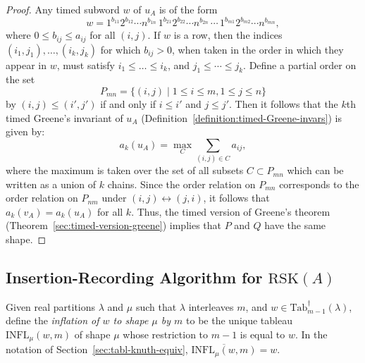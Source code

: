 \documentclass[10pt]{amsproc}
\theoremstyle{definition}
\theoremstyle{remark}
\newcommand{\ttab}{\mathrm{Tab}^\dagger}
\newcommand{\rsk}{\mathrm{RSK}}
\newcommand{\infl}{\mathrm{INFL}}
\begin{document}
\begin{proof}
  Any timed subword $w$ of $u_A$ is of the form
  \begin{displaymath}
    w=1^{b_{11}}2^{b_{12}}\dotsb n^{b_{1n}}\,1^{b_{21}}2^{b_{22}}\dotsb n^{b_{2n}}\,\dotsb \,1^{b_{m1}}2^{b_{m2}}\dotsb n^{b_{mn}},    
  \end{displaymath}
  where $0\leq b_{ij}\leq a_{ij}$ for all $(i,j)$.
  If $w$ is a row, then the indices $(i_1,j_1),\dotsc,(i_k,j_k)$ for which $b_{ij}>0$, when taken in the order in which they appear in $w$, must satisfy $i_1\leq \dotsc \leq i_k$, and $j_1\leq \dotsb \leq j_k$.
  Define a partial order on the set
  \begin{displaymath}
    P_{mn} = \{(i,j)\mid 1\leq i\leq m,1\leq j \leq n\}
  \end{displaymath}
  by $(i,j)\leq (i',j')$ if and only if $i\leq i'$ and $j\leq j'$.
  Then it follows that the $k$th timed Greene's invariant of $u_A$ (Definition~\ref{definition:timed-Greene-invars}) is given by:
  \begin{displaymath}
    a_k(u_A) = \max_C \sum_{(i,j)\in C} a_{ij},
  \end{displaymath}
  where the maximum is taken over the set of all subsets $C\subset P_{mn}$ which can be written as a union of $k$ chains.
  Since the order relation on $P_{mn}$ corresponds to the order relation on $P_{nm}$ under $(i,j)\leftrightarrow (j,i)$, it follows that $a_k(v_A)=a_k(u_A)$ for all $k$.
  Thus, the timed version of Greene's theorem (Theorem~\ref{sec:timed-version-greene}) implies that $P$ and $Q$ have the same shape.
\end{proof}
\subsection{Insertion-Recording Algorithm for $\rsk(A)$}
\label{sec:insert-record-algor}
Given real partitions $\lambda$ and $\mu$ such that $\lambda$ interleaves $m$, and $w\in \ttab_{m-1}(\lambda)$, define the \emph{inflation of $w$ to shape $\mu$ by $m$} to be the unique tableau $\infl_\mu(w,m)$ of shape $\mu$ whose restriction to $m-1$ is equal to $w$.
In the notation of Section~\ref{sec:tabl-knuth-equiv}, $\overline{\infl_\mu(w,m)}=w$. 
\end{document}
